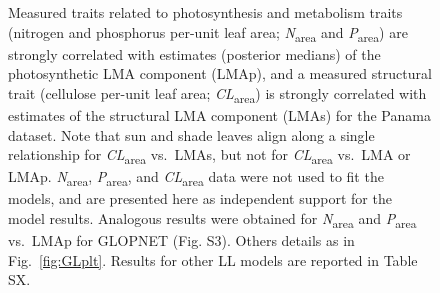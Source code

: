 \documentclass[
  12pt,
]{article}
\providecommand{\DIFaddendFL}{} %
\DeclareRobustCommand{\DIFaddendFL}{\DIFOaddendFL \let\includegraphics\DIFOincludegraphics} %
\begin{document}
\begin{figure}
{\caption{Measured traits related to photosynthesis and metabolism traits (nitrogen and phosphorus per-unit leaf area; \emph{N}\textsubscript{area} and \emph{P}\textsubscript{area}) are strongly correlated with estimates (posterior medians) of the photosynthetic LMA component (LMAp), and a measured structural trait (cellulose per-unit leaf area; \emph{CL}\textsubscript{area}) is strongly correlated with estimates of the structural LMA component (LMAs) for the Panama dataset.
Note that sun and shade leaves align along a single relationship for \emph{CL}\textsubscript{area} vs.~LMAs, but not for \emph{CL}\textsubscript{area} vs.~LMA or LMAp. \emph{N}\textsubscript{area}, \emph{P}\textsubscript{area}, and \emph{CL}\textsubscript{area} data were not used to fit the models, and are presented here as independent support for the model results.
Analogous results were obtained for \emph{N}\textsubscript{area} and \emph{P}\textsubscript{area} vs.~LMAp for GLOPNET (Fig. S3).
Others details as in Fig.~\ref{fig:GLplt}.
Results for other LL models are reported in Table SX.}\label{fig:PA-NPC}
}
\DIFaddendFL \end{figure}
\end{document}
